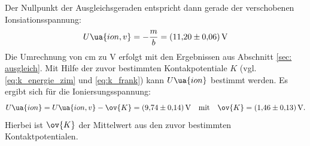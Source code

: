 Der Nullpunkt der Ausgleichsgeraden entspricht dann gerade der verschobenen
Ionsiationsspannung:
\begin{equation*}
  U\ua{ion,v}=-\frac{m}{b}=\SI{11.20\pm0.06}{\volt}
\end{equation*}
Die Umrechnung von $\si{\centi\meter}$ zu $\si{\volt}$ erfolgt mit den Ergebnissen aus
Abschnitt \ref{sec: ausgleich}.
Mit Hilfe der zuvor bestimmten Kontakpotentiale $K$ (vgl. \eqref{eq:k_energie_zim} und \eqref{eq:k_frank})
kann $U\ua{ion}$ bestimmt werden. Es ergibt sich für die Ioniersungsspannung:
\begin{equation}
  \label{eq: u_ion}
  U\ua{ion}= U\ua{ion,v}-\ov{K}=\SI{9.74\pm0.14}{\volt} \quad \text{mit} \quad \ov{K}=\SI{1.46\pm0.13}{\volt}.
\end{equation}
Hierbei ist $\ov{K}$ der Mittelwert aus den zuvor bestimmten Kontaktpotentialen.
\FloatBarrier
